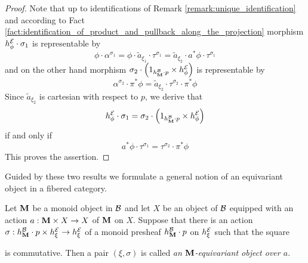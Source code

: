 \begin{proof}
Note that up to identifications of Remark \ref{remark:unique_identification} and according to Fact \ref{fact:identification_of_product_and_pullback_along_the_projection}  morphism $h^{{\mathcal E}}_{\phi}\cdot \sigma_1$ is representable by
$$\phi\cdot \alpha^{\sigma_1} = \phi\cdot \widetilde{a}_{\xi_1}\cdot \tau^{\sigma_1} = \widetilde{a}_{\xi_2}\cdot a^*\phi \cdot \tau^{\sigma_1}$$
and on the other hand morphism $\sigma_2\cdot \left(1_{h^{{\mathcal B}}_{\mathbf{M}}\cdot p}\times h^{{\mathcal E}}_{\phi}\right)$ is representable by
$$\alpha^{\sigma_2}\cdot \pi^*\phi = \widetilde{a}_{\xi_2}\cdot \tau^{\sigma_2}\cdot \pi^*\phi$$
Since $\widetilde{a}_{\xi_2}$ is cartesian with respect to $p$, we derive that
$$h^{{\mathcal E}}_{\phi}\cdot \sigma_1 = \sigma_2\cdot \left(1_{h^{{\mathcal B}}_{\mathbf{M}}\cdot p}\times h^{{\mathcal E}}_{\phi}\right)$$
if and only if
$$a^*\phi \cdot \tau^{\sigma_1} = \tau^{\sigma_2}\cdot \pi^*\phi$$
This proves the assertion.
\end{proof}
\noindent
Guided by these two results we formulate a general notion of an equivariant object in a fibered category.

\begin{definition}
Let $\mathbf{M}$ be a monoid object in ${\mathcal B}$ and let $X$ be an object of ${\mathcal B}$ equipped with an action $a:\mathbf{M}\times X\rightarrow X$ of $\mathbf{M}$ on $X$. Suppose that there is an action $\sigma:h^{{\mathcal B}}_{\mathbf{M}} \cdot p \times h^{{\mathcal E}}_\xi\rightarrow h^{{\mathcal E}}_\xi$ of a monoid presheaf $h^{{\mathcal B}}_{\mathbf{M}} \cdot p$ on $h^{{\mathcal E}}_\xi$ such that the square
\begin{center}
\end{center}
is commutative. Then a pair $(\xi,\sigma)$ is called \textit{an $\mathbf{M}$-equivariant object over $a$}.
\end{definition}


